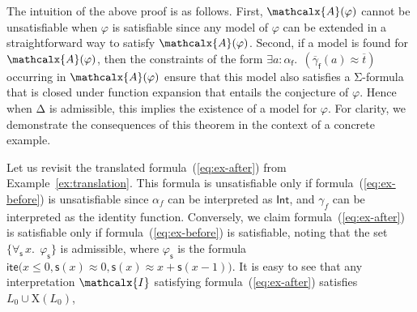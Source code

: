 \documentclass[runningheads,a4paper]{llncs}
\newcommand\DDD{\Delta}
\newcommand{\con}[1]{\mathsf{#1}}
\renewcommand\vec[1]{\overline{#1}}
\let\oldcup=\cup
\def\cup{\mathrel{\oldcup}}
\let\oldSigma=\Sigma
\def\Sigma{\mathrm{\oldSigma}}
\let\oldDelta=\Delta
\def\Delta{\mathrm{\oldDelta}}
\newcommand{\teq}{\approx}
\newcommand{\I}{\mathcalx{I}}
\newcommand{\conv}{\mathcalx{A}}
\newcommand{\typeint}{\ty{Int}}
\newcommand\ty[1]{\con{#1}}
\newcommand{\lite}{\con{ite}}
\newcommand\concret{\gamma} %
\newcommand{\forallf}[1]{\forall_{\!#1\:}}
\newcommand{\vecfarg}[1]{\vec{\concret}_{#1}}
\newcommand{\farg}[1]{\concret_{#1}}
\newcommand{\fargtype}[1]{\alpha_{#1}}
\newcommand{\rem}[1]{\textcolor{red}{[#1]}}
\newcommand{\ct}[1]{\rem{#1 --ct}}
\newcommand{\absconstraints}{\mathrm{X}}
\begin{document}
The intuition of the above proof is as follows.
First, $\conv( \varphi )$ cannot be unsatisfiable when $\varphi$ is satisfiable
since any model of $\varphi$ can be extended in a straightforward way to satisfy $\conv( \varphi )$.
Second, if a model is found for $\conv( \varphi )$,
then the constraints of the form $\exists a : \fargtype{\con{f}}.\;\, (\vecfarg{\con{f}}( a ) \teq \vec t)$
occurring in $\conv( \varphi )$ ensure that this model also satisfies
a $\Sigma$-formula that is closed under function expansion that entails the conjecture of $\varphi$.
Hence when $\DDD$ is admissible, this implies the existence of a model for $\varphi$.
For clarity, we demonstrate the consequences of this theorem in the context of a concrete example.

\begin{example}
Let us revisit the translated formula~(\ref{eq:ex-after}) from
Example~\ref{ex:translation}. 
This formula is unsatisfiable only if
formula~(\ref{eq:ex-before}) is unsatisfiable since $\fargtype{f}$ can be
interpreted as $\typeint$, and $\farg{f}$ can be interpreted as the identity
function. Conversely, we claim formula~(\ref{eq:ex-after}) is satisfiable
only if formula~(\ref{eq:ex-before}) is satisfiable, noting that the set
$\{ \forallf{\con{s}} x.\;\, \varphi_\con{s} \}$ is admissible,
where $\varphi_\con{s}$ is the formula $\lite\bigl( x \leq 0, \con{s}(x) \teq 0, \con{s}( x ) \teq x + \con{s}( x-1 ) \bigr)$.
It is easy to see that any interpretation $\I$ satisfying formula~(\ref{eq:ex-after}) satisfies $L_0 \cup \absconstraints( L_0 )$,

\end{example}
\end{document}

